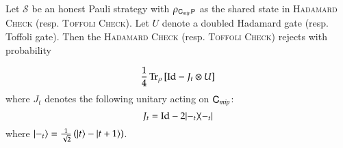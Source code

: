 %
%    
%

\begin{lemma}
\label{lem:ver_gate_check}
	Let $\mathcal{S}$ be an honest Pauli strategy with $\rho_{{\mathsf{C}}_{mip} {\mathsf{P}}}$ as the shared state in \textsc{Hadamard Check} (resp. \textsc{Toffoli Check}). Let $U$ denote a doubled Hadamard gate (resp. Toffoli gate). Then the \textsc{Hadamard Check} (resp. \textsc{Toffoli Check}) rejects with probability  
	
	\[
		\frac{1}{4} \operatorname{Tr}_{\rho} \left[ \mathop{\mathrm{Id}}\!\mathinner{} - J_t \otimes U \right ]
	\]
	where $J_t$ denotes the following unitary acting on ${\mathsf{C}}_{mip}$:
	\[
		J_t = \mathop{\mathrm{Id}}\!\mathinner{} - 2|-_t\rangle\! \langle -_t|
	\]
	where $|-_t\rangle = \frac{1}{\sqrt{2}} \left( |t\rangle - |t+1\rangle \right)$.
\end{lemma}

